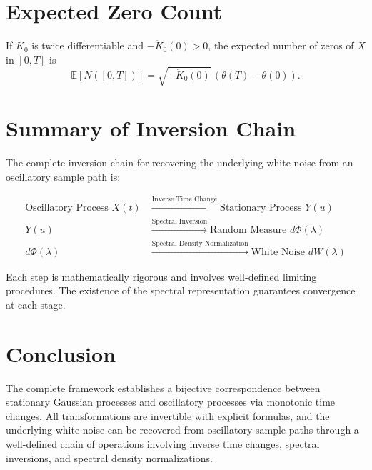 \documentclass{article}
\begin{document}
\section{Expected Zero Count}

If $K_0$ is twice differentiable and $-\ddot{K}_0(0)>0$, the expected number of zeros of $X$ in $[0,T]$ is
\[
\mathbb{E}[N([0,T])] = \sqrt{-\ddot{K}_0(0)}\, (\theta(T)-\theta(0)).
\]

\section{Summary of Inversion Chain}

The complete inversion chain for recovering the underlying white noise from an oscillatory sample path is:

\begin{align}
\text{Oscillatory Process } X(t) &\xrightarrow{\text{Inverse Time Change}} \text{Stationary Process } Y(u) \\
Y(u) &\xrightarrow{\text{Spectral Inversion}} \text{Random Measure } d\Phi(\lambda) \\
d\Phi(\lambda) &\xrightarrow{\text{Spectral Density Normalization}} \text{White Noise } dW(\lambda)
\end{align}

Each step is mathematically rigorous and involves well-defined limiting procedures. The existence of the spectral representation guarantees convergence at each stage.

\section{Conclusion}

The complete framework establishes a bijective correspondence between stationary Gaussian processes and oscillatory processes via monotonic time changes. All transformations are invertible with explicit formulas, and the underlying white noise can be recovered from oscillatory sample paths through a well-defined chain of operations involving inverse time changes, spectral inversions, and spectral density normalizations.
\end{document}
